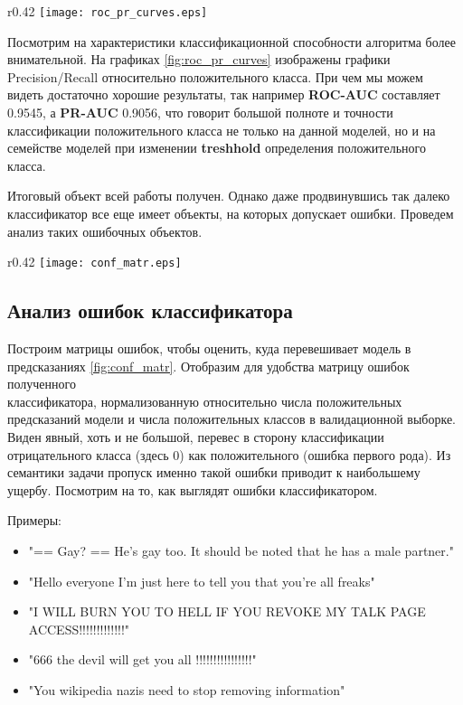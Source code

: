 \documentclass{article}
\begin{document}
\begin{wrapfigure}[15]{r}{0.42\textwidth}
    \centering
    \texttt{[image: roc\_pr\_curves.eps]}
    \caption{ROC и Precision/Recall кривые лучшего классификатора}
    \label{fig:roc_pr_curves}
\end{wrapfigure}

    Посмотрим на характеристики классификационной способности алгоритма более внимательной. На графиках \ref{fig:roc_pr_curves} изображены графики Precision/Recall относительно положительного класса. При чем мы можем видеть достаточно хорошие результаты, так например \textbf{ROC-AUC} составляет 0.9545, а \textbf{PR-AUC} 0.9056, что говорит большой полноте и точности классификации положительного класса не только на данной моделей, но и на семействе моделей при изменении \textbf{treshhold} определения положительного класса.

    Итоговый объект всей работы получен. Однако даже продвинувшись так далеко классификатор все еще имеет объекты, на которых допускает ошибки. Проведем анализ таких ошибочных объектов.

\begin{wrapfigure}[15]{r}{0.42\textwidth}
    \centering
    \texttt{[image: conf\_matr.eps]}
    \caption{Нормализированные матрицы ошибок на валидации}
    \label{fig:conf_matr}
\end{wrapfigure}

    \subsection{Анализ ошибок классификатора}

        Построим матрицы ошибок, чтобы оценить, куда перевешивает модель в предсказаниях \ref{fig:conf_matr}. Отобразим для удобства матрицу ошибок полученного \\классификатора, нормализованную относительно числа положительных предсказаний модели и числа положительных классов в валидационной выборке. Виден явный, хоть и не большой, перевес в сторону классификации отрицательного класса (здесь 0) как положительного (ошибка первого рода). Из семантики задачи пропуск именно такой ошибки приводит к наибольшему ущербу. Посмотрим на то, как выглядят ошибки классификатором.

\clearpage

        Примеры:
        \begin{itemize}
            \item "== Gay? == \n He's gay too. It should be noted that he has a male partner."
            \item "Hello everyone I'm just here to tell you that you're all freaks"
            \item "I WILL BURN YOU TO HELL IF YOU REVOKE MY TALK PAGE ACCESS!!!!!!!!!!!!!"
            \item "666 the devil will get you all !!!!!!!!!!!!!!!!"
            \item "You wikipedia nazis need to stop removing information"
        \end{itemize}
        
\end{document}
